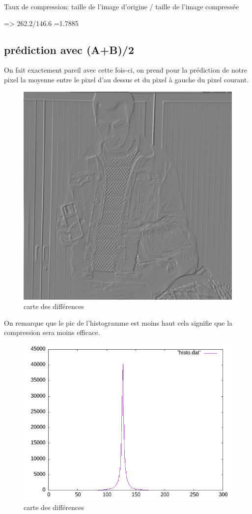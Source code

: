 \documentclass{article}
\begin{document}
Taux de compression: taille de l'image d'origine / taille de l'image compressée

=> 262.2/146.6 =1.7885


\newpage
\subsection{prédiction avec (A+B)/2}
On fait exactement pareil avec cette fois-ci, on prend pour la prédiction de notre pixel la moyenne entre le pixel d'au dessus et du pixel à gauche du pixel courant.
\begin{figure}[h]
\centerline{\includegraphics[scale=0.4]{./rendus/MaribaultErreurPredAplusBsur2.png} }
\caption{carte des différences}
\end{figure}

On remarque que le pic de l'histogramme est moins haut cela signifie que la compression sera moins efficace.
\begin{figure}[h]
\centerline{\includegraphics[scale=0.5]{./rendus/histoAplusBsur2.png} }
\caption{carte des différences}
\end{figure}
\end{document}
